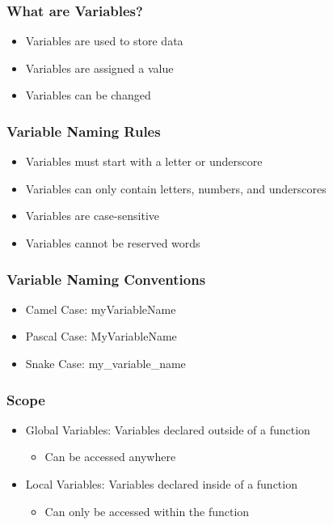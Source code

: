 \documentclass[serif, 9pt, aspectratio=32]{beamer}
\begin{document}
\begin{frame}
    \centering
    \frametitle{What are Variables?}
    \begin{itemize}
        \setlength{\itemsep}{3em}
        \item Variables are used to store data
        \item Variables are assigned a value
        \item Variables can be changed
    \end{itemize}
\end{frame}

\begin{frame}
    \centering
    \frametitle{Variable Naming Rules}
    \begin{itemize}
        \setlength{\itemsep}{3em}
        \item Variables must start with a letter or underscore
        \item Variables can only contain letters, numbers, and underscores
        \item Variables are case-sensitive
        \item Variables cannot be reserved words
    \end{itemize}
\end{frame}

\begin{frame}
    \centering
    \frametitle{Variable Naming Conventions}
    \begin{itemize}
        \setlength{\itemsep}{3em}
        \item Camel Case: myVariableName
        \item Pascal Case: MyVariableName
        \item Snake Case: my\_variable\_name
    \end{itemize}
\end{frame}

\begin{frame}
    \centering
    \frametitle{Scope}
    \begin{itemize}
        \setlength{\itemsep}{3em}
        \item Global Variables: Variables declared outside of a function
              \begin{itemize}
                  \item Can be accessed anywhere
              \end{itemize}
        \item Local Variables: Variables declared inside of a function
              \begin{itemize}
                  \item Can only be accessed within the function
              \end{itemize}
    \end{itemize}
\end{frame}
\end{document}
